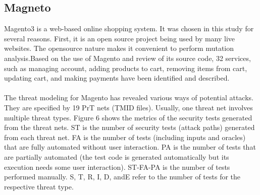 \subsection{Magneto}
Magento3 is a web-based online shopping system. It was
chosen in this study for several reasons. First, it is an open
source project being used by many live websites. The opensource
nature makes it convenient to perform mutation
analysis.Based on the use of Magento and
review of its source code, 32 services, such as managing account, adding products to cart, removing items from cart, updating cart, and making
payments have been identified and described.
\paragraph*{}
The threat modeling for Magento has revealed various
ways of potential attacks. They are specified by 19 PrT nets
(TMID files). Usually, one threat net involves multiple threat
types. Figure 6 shows the metrics of the security tests
generated from the threat nets. ST is the number of security
tests (attack paths) generated from each threat net. FA is the
number of tests (including inputs and oracles) that are fully
automated without user interaction. PA is the number of
tests that are partially automated (the test code is generated
automatically but its execution needs some user interaction).
ST-FA-PA is the number of tests performed manually. S, T, R,
I, D, andE refer to the number of tests for the respective threat
type.
